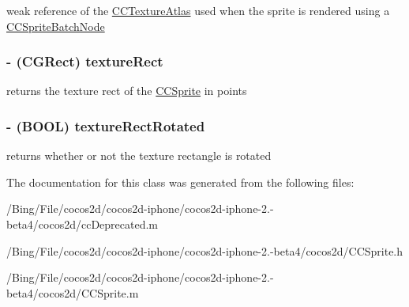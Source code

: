 weak reference of the \hyperlink{interface_c_c_texture_atlas}{C\-C\-Texture\-Atlas} used when the sprite is rendered using a \hyperlink{interface_c_c_sprite_batch_node}{C\-C\-Sprite\-Batch\-Node} \hypertarget{class_c_c_sprite_aa793e1433058539e5664ffd3533ab928}{
\subsubsection[{texture\-Rect}]{\setlength{\rightskip}{0pt plus 5cm}-\/ (C\-G\-Rect) {\bf texture\-Rect}}}\label{class_c_c_sprite_aa793e1433058539e5664ffd3533ab928}
returns the texture rect of the \hyperlink{class_c_c_sprite}{C\-C\-Sprite} in points \hypertarget{class_c_c_sprite_ae36ca8caa7122797c7ece2eb6f9d3182}{
\subsubsection[{texture\-Rect\-Rotated}]{\setlength{\rightskip}{0pt plus 5cm}-\/ (B\-O\-O\-L) {\bf texture\-Rect\-Rotated}}}\label{class_c_c_sprite_ae36ca8caa7122797c7ece2eb6f9d3182}
returns whether or not the texture rectangle is rotated 

The documentation for this class was generated from the following files\-:\begin{DoxyCompactItemize}
\item 
/\-Bing/\-File/cocos2d/cocos2d-\/iphone/cocos2d-\/iphone-\/2.-\/beta4/cocos2d/cc\-Deprecated.\-m\item 
/\-Bing/\-File/cocos2d/cocos2d-\/iphone/cocos2d-\/iphone-\/2.-\/beta4/cocos2d/C\-C\-Sprite.\-h\item 
/\-Bing/\-File/cocos2d/cocos2d-\/iphone/cocos2d-\/iphone-\/2.-\/beta4/cocos2d/C\-C\-Sprite.\-m\end{DoxyCompactItemize}
